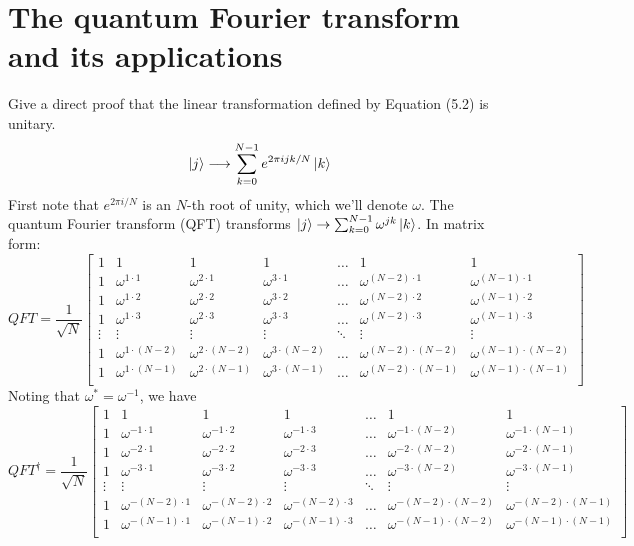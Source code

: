 
\chapter{The quantum Fourier transform and its applications}

 Give a direct proof that the linear transformation defined by Equation (5.2) is unitary.
$$\ket{j}\longrightarrow \sum_{k=0}^{N-1}e^{2\pi ijk/N}\ket{k}$$
\Soln First note that $e^{2\pi i/N}$ is an $N$-th root of unity, which we'll denote $\omega$.  The quantum Fourier transform (QFT) transforms $\ket{j}\rightarrow\sum_{k=0}^{N-1}\omega^{jk}\ket{k}$.  In matrix form:
$$QFT=\frac{1}{\sqrt{N}}\begin{bmatrix}1 & 1 & 1 & 1 &\ldots & 1 & 1 \\
1 & \omega^{1\cdot 1} & \omega^{2\cdot 1} & \omega^{3\cdot 1}& \ldots & \omega^{(N-2)\cdot 1} & \omega^{(N-1)\cdot 1} \\
1 & \omega^{1\cdot 2} & \omega^{2\cdot 2} & \omega^{3\cdot 2} & \ldots & \omega^{(N-2)\cdot 2} & \omega^{(N-1)\cdot 2} \\
1 & \omega^{1\cdot 3} & \omega^{2\cdot 3} & \omega^{3\cdot 3} & \ldots & \omega^{(N-2)\cdot 3} & \omega^{(N-1)\cdot 3} \\
\vdots & \vdots & \vdots & \vdots & \ddots & \vdots & \vdots \\
1 &  \omega^{1\cdot(N-2)} & \omega^{2\cdot (N-2)} & \omega^{3\cdot (N-2)} & \ldots & \omega^{(N-2)\cdot (N-2)} & \omega^{(N-1)\cdot (N-2)} \\
1 &  \omega^{1\cdot(N-1)} & \omega^{2\cdot (N-1)} & \omega^{3\cdot (N-1)} & \ldots & \omega^{(N-2)\cdot (N-1)} & \omega^{(N-1)\cdot (N-1)} \\
\end{bmatrix}$$
Noting that $\omega^* = \omega^{-1}$, we have
$$QFT^\dagger=\frac{1}{\sqrt{N}}\begin{bmatrix}1 & 1 & 1 & 1 &\ldots & 1 & 1 \\
1 & \omega^{-1\cdot 1} & \omega^{-1\cdot2} & \omega^{-1\cdot 3}& \ldots & \omega^{-1\cdot(N-2)} & \omega^{-1\cdot(N-1)} \\
1 & \omega^{-2\cdot1} & \omega^{-2\cdot 2} & \omega^{-2\cdot 3} & \ldots & \omega^{-2\cdot(N-2)} & \omega^{-2\cdot(N-1)} \\
1 & \omega^{-3\cdot1} & \omega^{-3\cdot2} & \omega^{-3\cdot 3} & \ldots &  \omega^{-3\cdot(N-2)} & \omega^{-3\cdot(N-1)} \\
\vdots & \vdots & \vdots & \vdots & \ddots & \vdots & \vdots \\
1 &  \omega^{-(N-2)\cdot 1} & \omega^{-(N-2)\cdot 2} & \omega^{-(N-2)\cdot 3} & \ldots & \omega^{-(N-2)\cdot (N-2)} & \omega^{-(N-2)\cdot (N-1)} \\
1 &  \omega^{-(N-1)\cdot 1} & \omega^{-(N-1)\cdot 2} & \omega^{-(N-1)\cdot 3} & \ldots & \omega^{-(N-1)\cdot (N-2)} & \omega^{-(N-1)\cdot (N-1)} \\
\end{bmatrix}$$
